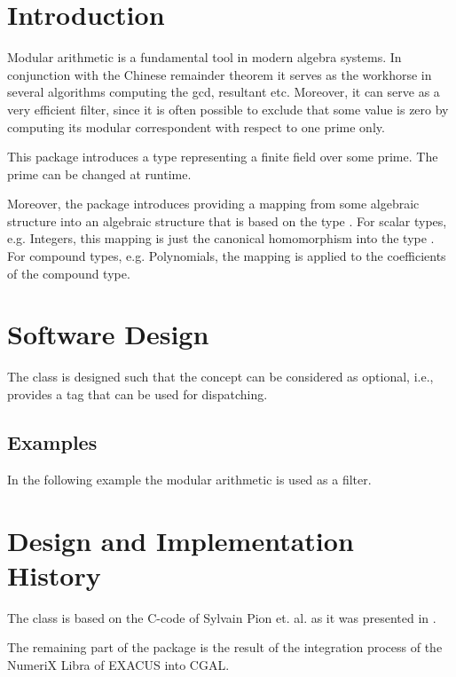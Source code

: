 \cleardoublepage
{}



\section{Introduction}

Modular arithmetic is a fundamental tool in modern algebra systems. In conjunction with the Chinese remainder theorem it serves as the workhorse in several algorithms computing the gcd, resultant etc. Moreover, it can serve as a very efficient filter, since it is often possible to exclude that some value is zero by computing its modular correspondent with respect to one prime only. 

This package introduces a type 
representing a finite field over some prime. 
The prime can be changed at runtime. 

Moreover, the package introduces  
providing a mapping from some algebraic structure  into an algebraic 
structure that is based on the type .  
For scalar types, e.g. Integers, this mapping is just the canonical homomorphism
into the type . 
For compound types, e.g. Polynomials, the mapping is applied to the 
coefficients of the compound type. 


\section{Software Design}

The class  is designed such that the concept 
 can be considered as optional, i.e., 
 provides a tag that can be used for dispatching. 

\subsection{Examples}

In the following example the modular arithmetic is used as a filter. 


\section{Design and Implementation History}

The class  is based on the C-code of Sylvain Pion et. al. 
as it was presented in \cite{bepp-sdrns-99}. 

The remaining part of the package is the result of the integration process
of the NumeriX Libra of EXACUS \cite{beh+-eeeafcs-05} into CGAL. 

